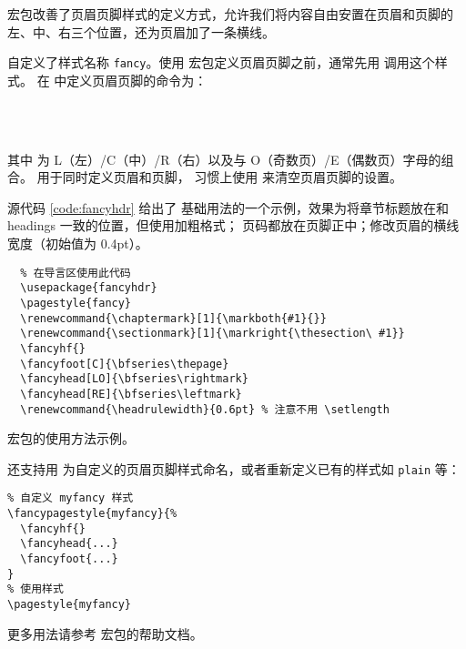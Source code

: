  宏包改善了页眉页脚样式的定义方式，允许我们将内容自由安置在页眉和页脚的左、中、右三个位置，还为页眉加了一条横线。

 自定义了样式名称 \texttt{fancy}。使用  宏包定义页眉页脚之前，通常先用  调用这个样式。
在  中定义页眉页脚的命令为：
\begin{command}
\marg*{\ldots}\\
\marg*{\ldots}\\
\marg*{\ldots}
\end{command}
其中  为 L（左）/C（中）/R（右）以及与 O（奇数页）/E（偶数页）字母的组合。 用于同时定义页眉和页脚，
习惯上使用 \marg*{} 来清空页眉页脚的设置。

源代码 \ref{code:fancyhdr} 给出了  基础用法的一个示例，效果为将章节标题放在和 headings 一致的位置，但使用加粗格式；
页码都放在页脚正中；修改页眉的横线宽度（初始值为 0.4pt）。

\begin{sourcecode}[htp]
  \begin{Verbatim}
  % 在导言区使用此代码
  \usepackage{fancyhdr}
  \pagestyle{fancy}
  \renewcommand{\chaptermark}[1]{\markboth{#1}{}}
  \renewcommand{\sectionmark}[1]{\markright{\thesection\ #1}}
  \fancyhf{}
  \fancyfoot[C]{\bfseries\thepage}
  \fancyhead[LO]{\bfseries\rightmark}
  \fancyhead[RE]{\bfseries\leftmark}
  \renewcommand{\headrulewidth}{0.6pt} % 注意不用 \setlength
  \end{Verbatim}
  \caption{ 宏包的使用方法示例。}\label{code:fancyhdr}
\end{sourcecode}

 还支持用  为自定义的页眉页脚样式命名，或者重新定义已有的样式如 \texttt{plain} 等：
\begin{verbatim}
% 自定义 myfancy 样式
\fancypagestyle{myfancy}{%
  \fancyhf{}
  \fancyhead{...}
  \fancyfoot{...}
}
% 使用样式
\pagestyle{myfancy}
\end{verbatim}

更多用法请参考  宏包的帮助文档。


\endinput
